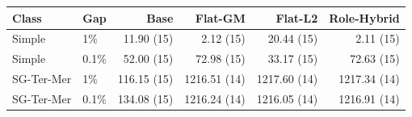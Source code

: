 \begin{tabular}{llrrrr}
\toprule
Class & Gap & Base & Flat-GM & Flat-L2 & Role-Hybrid \\
\midrule
Simple & 1\% & 11.90 (15) & 2.12 (15) & 20.44 (15) & 2.11 (15) \\
Simple & 0.1\% & 52.00 (15) & 72.98 (15) & 33.17 (15) & 72.63 (15) \\
SG-Ter-Mer & 1\% & 116.15 (15) & 1216.51 (14) & 1217.60 (14) & 1217.34 (14) \\
SG-Ter-Mer & 0.1\% & 134.08 (15) & 1216.24 (14) & 1216.05 (14) & 1216.91 (14) \\
\bottomrule
\end{tabular}
